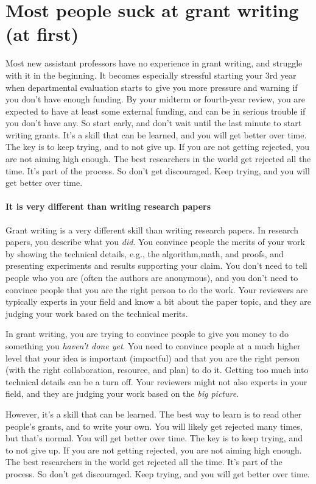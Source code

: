 \documentclass[oneside,11pt,dvipsnames]{book}
\begin{document}
\section{Most people suck at grant writing (at first)} Most new assistant professors have no experience in grant writing, and struggle with it in the beginning.  It becomes especially stressful starting your 3rd year when departmental evaluation starts to give you more pressure and warning if you don't have enough funding. By your midterm or fourth-year review, you are expected to have at least some external funding, and can be in serious trouble if you don't have any. So start early, and don't wait until the last minute to start writing grants.  It's a skill that can be learned, and you will get better over time.  The key is to keep trying, and to not give up.  If you are not getting rejected, you are not aiming high enough.  The best researchers in the world get rejected all the time.  It's part of the process.  So don't get discouraged.  Keep trying, and you will get better over time.




\paragraph{It is very different than writing research papers} Grant writing is a very different skill than writing research papers.  In research papers, you describe what you \emph{did}. You convince people the merits of your work by showing the technical details, e.g., the algorithm,math, and proofs, and presenting experiments and results supporting your claim. You don't need to tell people who you are (often the authors are anonymous), and you don't need to convince people that you are the right person to do the work.  Your reviewers are typically experts in your field and know a bit about the paper topic, and they are judging your work based on the technical merits.

In grant writing, you are trying to convince people to give you money to do something you \emph{haven't done yet}.  You need to convince people at a much higher level that your idea is important (impactful) and that you are the right person (with the right collaboration, resource, and plan) to do it. Getting too much into technical details can be a turn off.  Your reviewers might not also experts in your field, and they are judging your work based on the \emph{big picture}. 


However, it's a skill that can be learned.  The best way to learn is to read other people's grants, and to write your own.  You will likely get rejected many times, but that's normal.  You will get better over time.  The key is to keep trying, and to not give up.  If you are not getting rejected, you are not aiming high enough.  The best researchers in the world get rejected all the time.  It's part of the process.  So don't get discouraged.  Keep trying, and you will get better over time.
\end{document}
